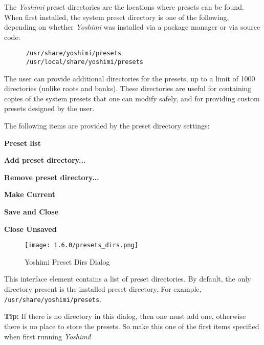    The \textsl{Yoshimi} preset directories are the locations where
   presets can be found.  When first installed, the system
   preset directory is one of the following, depending on whether
   \textsl{Yoshimi} was installed via a package manager or via source code:

   \begin{verbatim}
      /usr/share/yoshimi/presets
      /usr/local/share/yoshimi/presets
   \end{verbatim}

   The user can provide additional directories for the presets, up to a
   limit of 1000 directories (unlike roots and banks).
   These directories are useful for containing copies of the system
   presets that one can modify safely, and for providing custom
   presets designed by the user.

   The following items are provided by the preset directory settings:

   \begin{enumber}
      \item \textbf{Preset list}
      \item \textbf{Add preset directory...}
      \item \textbf{Remove preset directory...}
      \item \textbf{Make Current}
      \item \textbf{Save and Close}
      \item \textbf{Close Unsaved}
   \end{enumber}

\begin{figure}[H]
   \centering
   \texttt{[image: 1.6.0/presets\_dirs.png]}
   \caption[Preset Dirs Tab]{Yoshimi Preset Dirs Dialog}
   \label{fig:yoshimi_presets_dirs_tab}
\end{figure}

   \setcounter{ItemCounter}{0}      %

   This interface element contains a list of preset directories.
   By default, the only directory present is the installed preset directory.
   For example, \texttt{/usr/share/yoshimi/presets}.

   \textbf{Tip:}
   If there is no directory in this dialog, then one must
   add one, otherwise there is no place to store the presets.
   So make this one of the first items specified when first running
   \textsl{Yoshimi}!

